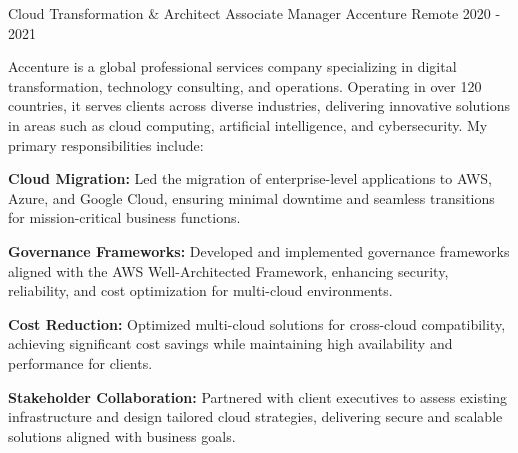 \documentclass[11pt, a4paper]{awesome-cv}
\begin{document}
\begin{cventries}
    \cventry
    {Cloud Transformation \& Architect Associate Manager} %
    {Accenture} %
    {Remote} %
    {2020 - 2021} %
    {
    	Accenture is a global professional services company specializing in digital transformation, technology consulting, and operations. Operating in over 120 countries, it serves clients across diverse industries, delivering innovative solutions in areas such as cloud computing, artificial intelligence, and cybersecurity. My primary responsibilities include:
    	\vspace{15pt}
    	\begin{cvitems} %
		    \item \textbf{Cloud Migration:} Led the migration of enterprise-level applications to AWS, Azure, and Google Cloud, ensuring minimal downtime and seamless transitions for mission-critical business functions.
		    \item \textbf{Governance Frameworks:} Developed and implemented governance frameworks aligned with the AWS Well-Architected Framework, enhancing security, reliability, and cost optimization for multi-cloud environments.
		    \item \textbf{Cost Reduction:} Optimized multi-cloud solutions for cross-cloud compatibility, achieving significant cost savings while maintaining high availability and performance for clients.
		    \item \textbf{Stakeholder Collaboration:} Partnered with client executives to assess existing infrastructure and design tailored cloud strategies, delivering secure and scalable solutions aligned with business goals.
    	\end{cvitems}
    }
    

\end{cventries}
\end{document}
